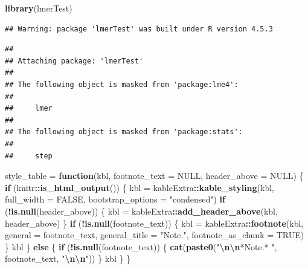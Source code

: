 \documentclass[
]{article}
\newenvironment{Shaded}{\begin{snugshade}}{\end{snugshade}}
\newcommand{\AttributeTok}[1]{\textcolor[rgb]{0.13,0.29,0.53}{#1}}
\newcommand{\ConstantTok}[1]{\textcolor[rgb]{0.56,0.35,0.01}{#1}}
\newcommand{\ControlFlowTok}[1]{\textcolor[rgb]{0.13,0.29,0.53}{\textbf{#1}}}
\newcommand{\FunctionTok}[1]{\textcolor[rgb]{0.13,0.29,0.53}{\textbf{#1}}}
\newcommand{\NormalTok}[1]{#1}
\newcommand{\OtherTok}[1]{\textcolor[rgb]{0.56,0.35,0.01}{#1}}
\newcommand{\SpecialCharTok}[1]{\textcolor[rgb]{0.81,0.36,0.00}{\textbf{#1}}}
\newcommand{\StringTok}[1]{\textcolor[rgb]{0.31,0.60,0.02}{#1}}
\begin{document}
\begin{Shaded}
\begin{Highlighting}[]
\FunctionTok{library}\NormalTok{(lmerTest)}
\end{Highlighting}
\end{Shaded}

\begin{verbatim}
## Warning: package 'lmerTest' was built under R version 4.5.3
\end{verbatim}

\begin{verbatim}
## 
## Attaching package: 'lmerTest'
## 
## The following object is masked from 'package:lme4':
## 
##     lmer
## 
## The following object is masked from 'package:stats':
## 
##     step
\end{verbatim}

\begin{Shaded}
\begin{Highlighting}[]
\NormalTok{style\_table }\OtherTok{=} \ControlFlowTok{function}\NormalTok{(kbl, }\AttributeTok{footnote\_text =} \ConstantTok{NULL}\NormalTok{, }\AttributeTok{header\_above =} \ConstantTok{NULL}\NormalTok{) \{}
  \ControlFlowTok{if}\NormalTok{ (knitr}\SpecialCharTok{::}\FunctionTok{is\_html\_output}\NormalTok{()) \{}
\NormalTok{    kbl }\OtherTok{=}\NormalTok{ kableExtra}\SpecialCharTok{::}\FunctionTok{kable\_styling}\NormalTok{(kbl, }\AttributeTok{full\_width =} \ConstantTok{FALSE}\NormalTok{,}
                                     \AttributeTok{bootstrap\_options =} \StringTok{"condensed"}\NormalTok{)}
    \ControlFlowTok{if}\NormalTok{ (}\SpecialCharTok{!}\FunctionTok{is.null}\NormalTok{(header\_above)) \{}
\NormalTok{      kbl }\OtherTok{=}\NormalTok{ kableExtra}\SpecialCharTok{::}\FunctionTok{add\_header\_above}\NormalTok{(kbl, header\_above)}
\NormalTok{    \}}
    \ControlFlowTok{if}\NormalTok{ (}\SpecialCharTok{!}\FunctionTok{is.null}\NormalTok{(footnote\_text)) \{}
\NormalTok{      kbl }\OtherTok{=}\NormalTok{ kableExtra}\SpecialCharTok{::}\FunctionTok{footnote}\NormalTok{(kbl, }\AttributeTok{general =}\NormalTok{ footnote\_text,}
                                  \AttributeTok{general\_title =} \StringTok{"Note."}\NormalTok{,}
                                  \AttributeTok{footnote\_as\_chunk =} \ConstantTok{TRUE}\NormalTok{)}
\NormalTok{    \}}
\NormalTok{    kbl}
\NormalTok{  \} }\ControlFlowTok{else}\NormalTok{ \{}
    \ControlFlowTok{if}\NormalTok{ (}\SpecialCharTok{!}\FunctionTok{is.null}\NormalTok{(footnote\_text)) \{}
      \FunctionTok{cat}\NormalTok{(}\FunctionTok{paste0}\NormalTok{(}\StringTok{"}\SpecialCharTok{\textbackslash{}n\textbackslash{}n}\StringTok{*Note.* "}\NormalTok{, footnote\_text, }\StringTok{"}\SpecialCharTok{\textbackslash{}n\textbackslash{}n}\StringTok{"}\NormalTok{))}
\NormalTok{    \}}
\NormalTok{    kbl}
\NormalTok{  \}}
\NormalTok{\}}
\end{Highlighting}
\end{Shaded}
\end{document}

